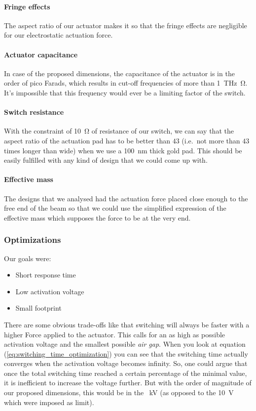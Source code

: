 \paragraph{Fringe effects}
The aspect ratio of our actuator makes it so that the fringe effects are negligible for our electrostatic actuation force.

\paragraph{Actuator capacitance}
In case of the proposed dimensions, the capacitance of the actuator is in the order of pico Farads, which results in cut-off frequencies of more than \SI{1}{\tera\hertz\ohm}.
It's impossible that this frequency would ever be a limiting factor of the switch.

\paragraph{Switch resistance}
With the constraint of \SI{10}{\ohm} of resistance of our switch, we can say that the aspect ratio of the actuation pad has to be better than $43$ (i.e.\ not more than $43$ times longer than wide) when we use a \SI{100}{\nano\meter} thick gold pad.
This should be easily fulfilled with any kind of design that we could come up with.

\paragraph{Effective mass}
The designs that we analysed had the actuation force placed close enough to the free end of the beam so that we could use the simplified expression of the effective mass which supposes the force to be at the very end.


\subsubsection{Optimizations}
\label{ssub:optimizations}

Our goals were:

\begin{itemize}
    \item Short response time
    \item Low activation voltage
    \item Small footprint
\end{itemize}

There are some obvious trade-offs like that switching will always be faster with a higher Force applied to the actuator.
This calls for an as high as possible activation voltage and the smallest possible \emph{air gap}.
When you look at equation (\ref{eq:switching_time_optimization}) you can see that the switching time actually converges when the activation voltage becomes infinity.
So, one could argue that once the total switching time reached a certain percentage of the minimal value, it is inefficient to increase the voltage further.
But with the order of magnitude of our proposed dimensions, this would be in the \SI{}{\kilo\volt} (as opposed to the \SI{10}{\volt} which were imposed as limit).

